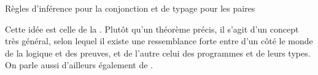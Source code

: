 \begin{marginfigure}




  
  \caption{Règles d’inférence pour la conjonction et de typage pour les paires}
  \label{fig:curry-howard-exemple}
\end{marginfigure}

Cette idée est celle de la .
Plutôt qu’un théorème précis, il s’agit d’un concept très général,
selon lequel il existe une ressemblance forte entre d’un côté le monde de la
logique et des preuves, et de l’autre celui des programmes et de leurs types.
On parle aussi d’ailleurs également de .


